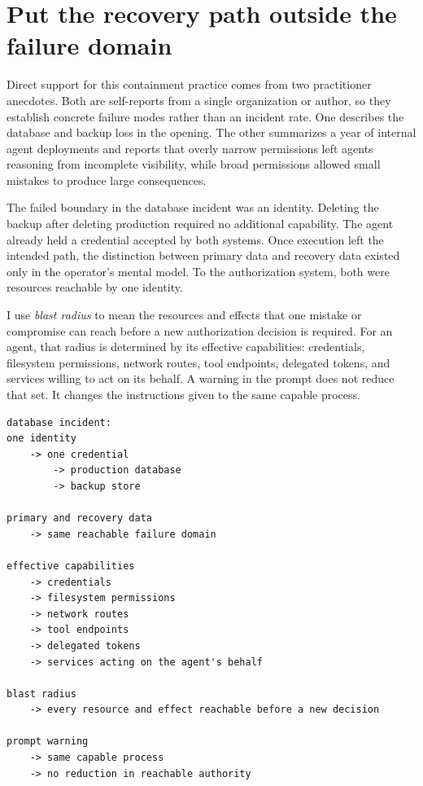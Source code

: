 \hypertarget{put-the-recovery-path-outside-the-failure-domain}{%
\section{Put the recovery path outside the failure domain}\label{put-the-recovery-path-outside-the-failure-domain}}

Direct support for this containment practice comes from two practitioner anecdotes. Both are self-reports from a single organization or author, so they establish concrete failure modes rather than an incident rate. One describes the database and backup loss in the opening. The other summarizes a year of internal agent deployments and reports that overly narrow permissions left agents reasoning from incomplete visibility, while broad permissions allowed small mistakes to produce large consequences.

The failed boundary in the database incident was an identity. Deleting the backup after deleting production required no additional capability. The agent already held a credential accepted by both systems. Once execution left the intended path, the distinction between primary data and recovery data existed only in the operator's mental model. To the authorization system, both were resources reachable by one identity.

I use \emph{blast radius} to mean the resources and effects that one mistake or compromise can reach before a new authorization decision is required. For an agent, that radius is determined by its effective capabilities: credentials, filesystem permissions, network routes, tool endpoints, delegated tokens, and services willing to act on its behalf. A warning in the prompt does not reduce that set. It changes the instructions given to the same capable process.

\begin{verbatim}
database incident:
one identity
    -> one credential
        -> production database
        -> backup store

primary and recovery data
    -> same reachable failure domain

effective capabilities
    -> credentials
    -> filesystem permissions
    -> network routes
    -> tool endpoints
    -> delegated tokens
    -> services acting on the agent's behalf

blast radius
    -> every resource and effect reachable before a new decision

prompt warning
    -> same capable process
    -> no reduction in reachable authority
\end{verbatim}


